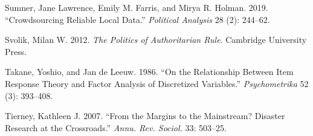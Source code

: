 \documentclass[]{article}
\begin{document}
\leavevmode\hypertarget{ref-sumneretal2019}{}%
Sumner, Jane Lawrence, Emily M. Farris, and Mirya R. Holman. 2019. ``Crowdsourcing Reliable Local Data.'' \emph{Political Analysis} 28 (2): 244--62.

\leavevmode\hypertarget{ref-svolik2012politics}{}%
Svolik, Milan W. 2012. \emph{The Politics of Authoritarian Rule}. Cambridge University Press.

\leavevmode\hypertarget{ref-takane1986}{}%
Takane, Yoshio, and Jan de Leeuw. 1986. ``On the Relationship Between Item Response Theory and Factor Analysis of Discretized Variables.'' \emph{Psychometrika} 52 (3): 393--408.

\leavevmode\hypertarget{ref-tierney2007margins}{}%
Tierney, Kathleen J. 2007. ``From the Margins to the Mainstream? Disaster Research at the Crossroads.'' \emph{Annu. Rev. Sociol.} 33: 503--25.
\end{document}

